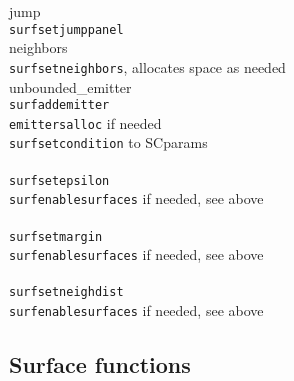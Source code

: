 \documentclass {book}
\begin{document}
\begin{tabbing}
\>jump\\
\>\>\texttt{surfsetjumppanel}\\
\>neighbors\\
\>\>\texttt{surfsetneighbors}, allocates space as needed\\
\>unbounded\_emitter\\
\>\>\texttt{surfaddemitter}\\
\>\>\>\texttt{emittersalloc} if needed\\
\>\>\>\texttt{surfsetcondition} to SCparams\\
\newline \\
\texttt{surfsetepsilon}\\
\>\texttt{surfenablesurfaces} if needed, see above\\
\newline \\
\texttt{surfsetmargin}\\
\>\texttt{surfenablesurfaces} if needed, see above\\
\newline \\
\texttt{surfsetneighdist}\\
\>\texttt{surfenablesurfaces} if needed, see above\\
\end{tabbing}


\subsection*{Surface functions}
\end{document}
